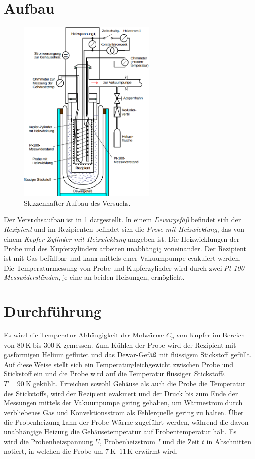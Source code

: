 \section{Aufbau}
\begin{figure}
	\centering
	\includegraphics[width=0.6\textwidth,]{graphics/aufbau.png}
	\caption{Skizzenhafter Aufbau des Versuchs. \cite{skript}}
	\label{fig:aufbau}
\end{figure}
Der Versuchsaufbau ist in \ref{fig:aufbau} dargestellt.
In einem \emph{Dewargefäß} befindet sich der \emph{Rezipient} und im Rezipienten befindet sich die \emph{Probe mit Heizwicklung}, das von einem \emph{Kupfer-Zylinder mit Heizwicklung} umgeben ist.
Die Heizwicklungen der Probe und des Kupferzylinders arbeiten unabhängig voneinander.
Der Rezipient ist mit Gas befüllbar und kann mittels einer Vakuumpumpe evakuiert werden. 
Die Temperaturmessung von Probe und Kupferzylinder wird durch zwei \emph{Pt-100-Messwiderständen}, je eine an beiden Heizungen, ermöglicht.


\section{Durchführung}
Es wird die Temperatur-Abhängigkeit der Molwärme $C_p$ von Kupfer im
Bereich von $\SI{80}{\kelvin}$ bis $\SI{300}{\kelvin}$ gemessen.
Zum Kühlen der Probe wird der Rezipient mit gasförmigen Helium geflutet
und das Dewar-Gefäß mit flüssigem Stickstoff gefüllt.
Auf diese Weise stellt sich ein Temperaturgleichgewicht zwischen Probe und Stickstoff ein und die Probe wird auf die Temperatur flüssigen Stickstoffs $T=\SI{90}{\kelvin}$ \cite{stickstoff} gekühlt.
Erreichen sowohl Gehäuse als auch die Probe die Temperatur des Stickstoffs, 
wird der Rezipient evakuiert und der Druck bis zum Ende der Messungen mittels der Vakuumpumpe gering gehalten, um Wärmestrom durch verbliebenes Gas und Konvektionsstrom als Fehlerquelle gering zu halten.
Über die Probenheizung kann der Probe Wärme zugeführt werden, 
während die davon unabhängige Heizung die Gehäusetemperatur auf Probentemperatur hält.
Es wird die Probenheizspannung $U$, Probenheizstrom $I$ und die Zeit $t$ in Abschnitten notiert, 
in welchen die Probe um $\SIrange{7}{11}{\kelvin}$ erwärmt wird.